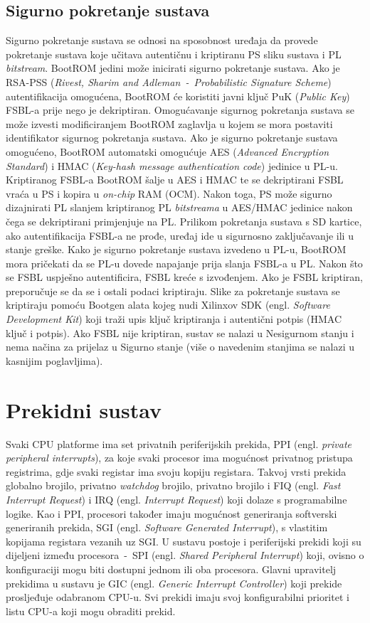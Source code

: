 \documentclass[times, utf8, diplomski, numeric]{fer}
\begin{document}
\subsection{Sigurno pokretanje sustava}
Sigurno pokretanje sustava se odnosi na sposobnost uređaja da provede pokretanje sustava koje učitava autentičnu i
kriptiranu PS sliku sustava i PL \textit{bitstream}. BootROM jedini može inicirati sigurno pokretanje sustava.
Ako je RSA-PSS (\textit{Rivest, Sharim and Adleman~-~Probabilistic Signature Scheme}) autentifikacija  omogućena,
BootROM će koristiti javni ključ PuK (\textit{Public Key}) FSBL-a prije nego je dekriptiran. Omogućavanje sigurnog
pokretanja sustava se može izvesti modificiranjem BootROM zaglavlja u kojem se mora postaviti identifikator sigurnog
pokretanja sustava. Ako je sigurno pokretanje sustava omogućeno, BootROM automatski omogućuje AES (\textit{Advanced
Encryption Standard}) i HMAC (\textit{Key-hash message authentication code}) jedinice u PL-u. Kriptiranog FSBL-a BootROM
šalje u AES i HMAC te se dekriptirani FSBL vraća u PS i kopira u \textit{on-chip} RAM (OCM). Nakon toga, PS može sigurno
dizajnirati PL slanjem kriptiranog PL \textit{bitstreama} u AES/HMAC jedinice nakon čega se dekriptirani primjenjuje na PL.
Prilikom pokretanja sustava s SD kartice, ako autentifikacija FSBL-a ne prođe, uređaj ide u sigurnosno zaključavanje
ili u stanje greške. Kako je sigurno pokretanje sustava izvedeno u PL-u, BootROM mora pričekati da se PL-u dovede napajanje
prija slanja FSBL-a u PL. Nakon što se FSBL uspješno autentificira, FSBL kreće s izvođenjem. Ako je FSBL kriptiran,
preporučuje se da se i ostali podaci kriptiraju. Slike za pokretanje sustava se kriptiraju pomoću Bootgen alata kojeg nudi
Xilinxov SDK (engl. \textit{Software Development Kit}) koji traži upis ključ kriptiranja i autentični potpis (HMAC ključ i
potpis). Ako FSBL nije kriptiran, sustav se nalazi u Nesigurnom stanju i nema načina za prijelaz u Sigurno stanje (više o
navedenim stanjima se nalazi u kasnijim poglavljima).
\section{Prekidni sustav}
Svaki CPU platforme ima set privatnih periferijskih prekida, PPI (engl. \textit{private peripheral interrupts}),
za koje svaki procesor ima mogućnost privatnog pristupa registrima, gdje svaki registar ima svoju kopiju registara.
Takvoj vrsti prekida globalno brojilo, privatno \textit{watchdog} brojilo, privatno brojilo i FIQ (engl.
\textit{Fast Interrupt Request}) i IRQ (engl. \textit{Interrupt Request}) koji dolaze s programabilne logike.
Kao i PPI, procesori također imaju mogućnost generiranja softverski generiranih prekida, SGI (engl. \textit{Software
Generated Interrupt}), s vlastitim kopijama registara vezanih uz SGI. U sustavu postoje i periferijski prekidi
koji su dijeljeni između procesora~-~SPI (engl. \textit{Shared Peripheral Interrupt}) koji, ovisno o konfiguraciji
mogu biti dostupni jednom ili oba procesora. Glavni upravitelj prekidima u sustavu je GIC (engl. \textit{Generic
Interrupt Controller}) koji prekide prosljeđuje odabranom CPU-u. Svi prekidi imaju svoj konfigurabilni prioritet
i listu CPU-a koji mogu obraditi prekid.
\end{document}
